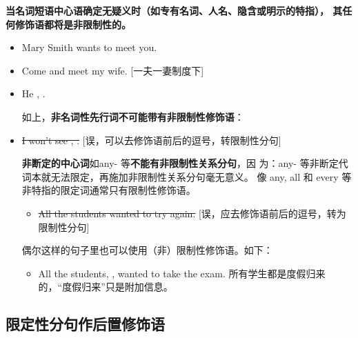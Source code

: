 \textbf{当名词短语中心语确定无疑义时（如专有名词、人名、隐含或明示的特指），
  其任何修饰语都将是非限制性的。}
\begin{itemize}
\item Mary Smith wants to meet you.
\item Come and meet my  wife. [一夫一妻制度下]


\item He , .

  如上，\textbf{非名词性先行词不可能带有非限制性修饰语}：


\item \sout{I won't see , .} [误，可以去修饰语前后的逗号，转限制性分句]

  \textbf{非断定的中心词}如any- 等\textbf{不能有非限制性关系分句}，因
  为：any- 等非断定代词本就无法限定，再施加非限制性关系分句毫无意义。
  像 any, all 和 every 等非特指的限定词通常只有限制性修饰语。

  \begin{itemize}
  \item \sout{All the students wanted to
      try again.} [误，应去修饰语前后的逗号，转为限制性分句]

  \end{itemize}

  偶尔这样的句子里也可以使用（非）限制性修饰语。如下：
  \begin{itemize}
  \item All the students, , wanted
    to take the exam.
    所有学生都是度假归来的，“度假归来”只是附加信息。
  \end{itemize}

\end{itemize}

\subsection{限定性分句作后置修饰语}

